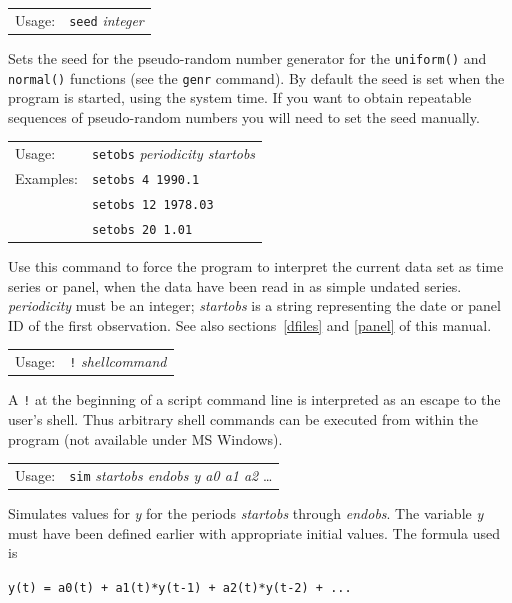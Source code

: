\documentclass{article}
\begin{document}
{

\begin{tabular}{ll}
Usage: &  \texttt{seed} \textit{integer} 
\end{tabular}

Sets the seed for the pseudo-random number generator for the
\texttt{uniform()} and \texttt{normal()} functions (see the
\texttt{genr} command).  By default the seed is set when the program
is started, using the system time.  If you want to obtain repeatable
sequences of pseudo-random numbers you will need to set the seed
manually.


\begin{tabular}{ll}
Usage:  &        \texttt{setobs} \textit{periodicity startobs} \\
Examples:  &     \texttt{setobs 4 1990.1} \\
           &     \texttt{setobs 12 1978.03} \\
           &     \texttt{setobs 20 1.01}
\end{tabular}

Use this command to force the program to interpret the current data
set as time series or panel, when the data have been read in as simple
undated series.  \textit{periodicity} must be an integer;
\textit{startobs} is a string representing the date or panel ID of the
first observation.  See also sections~\ref{dfiles} and \ref{panel} of
this manual.


\begin{tabular}{ll}
Usage: & \texttt{!} \textit{shellcommand}
\end{tabular}

A \texttt{!} at the beginning of a script command line is interpreted as an
escape to the user's shell.  Thus arbitrary shell commands can be
executed from within the program (not available under MS Windows).


\begin{tabular}{ll}
Usage:     &     \texttt{sim} \textit{startobs endobs y a0 a1 a2} \dots
\end{tabular}

Simulates values for \textit{y} for the periods \textit{startobs}
through \textit{endobs}.  The variable \textit{y} must have been
defined earlier with appropriate initial values. The formula used is

\texttt{y(t) = a0(t) + a1(t)*y(t-1) + a2(t)*y(t-2) + ...}
     
}
\end{document}
